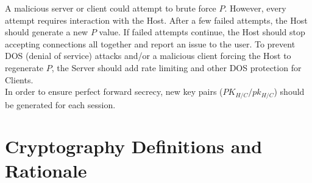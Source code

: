 \documentclass{article}
\begin{document}
    A malicious server or client could attempt to brute force $P$. However, every
    attempt requires interaction with the Host. After a few failed attempts, the
    Host should generate a new $P$ value. If failed attempts continue, the Host
    should stop accepting connections all together and report an issue to the user.
    To prevent DOS (denial of service) attacks and/or a malicious client forcing the
    Host to regenerate $P$, the Server should add rate limiting and other DOS
    protection for Clients.\\

    In order to ensure perfect forward secrecy, new key pairs
    ($PK_{H/C}/pk_{H/C}$) should be generated for each session.


    \section{Cryptography Definitions and Rationale}
\end{document}
